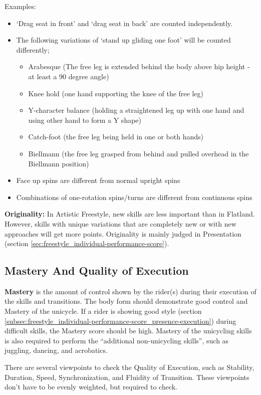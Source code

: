 Examples:
\begin{itemize}
\item `Drag seat in front' and `drag seat in back' are counted independently.
\item The following variations of `stand up gliding one foot' will be counted differently;
	\begin{itemize}
 	\item Arabesque (The free leg is extended behind the body above hip height - at least a 90 degree angle)
	\item Knee hold (one hand supporting the knee of the free leg)
	\item Y-character balance (holding a straightened leg up with one hand and using other hand to form a Y shape)
	\item Catch-foot (the free leg being held in one or both hands)
	\item Biellmann (the free leg grasped from behind and pulled overhead in the Biellmann position) 
	\end{itemize}
\item Face up spins are different from normal upright spins 
\item Combinations of one-rotation spins/turns are different from continuous spins
\end{itemize}

\textbf{Originality:} In Artistic Freestyle, new skills are less important than in Flatland.
However, skills with unique variations that are completely new or with new approaches will get more points.
Originality is mainly judged in Presentation (section \ref{sec:freestyle_individual-performance-score}).

\subsection{Mastery And Quality of Execution}
\textbf{Mastery} is the amount of control shown by the rider(s) during their execution of the skills and transitions.
The body form should demonstrate good control and Mastery of the unicycle.
If a rider is showing good style (section \ref{subsec:freestyle_individual-performance-score_presence-execution}) during difficult skills, the Mastery score should be high.
Mastery of the unicycling skills is also required to perform the ``additional non-unicycling skills'', such as juggling, dancing, and acrobatics.

There are several viewpoints to check the Quality of Execution, such as Stability, Duration, Speed, Synchronization, and Fluidity of Transition.
These viewpoints don't have to be evenly weighted, but required to check.

